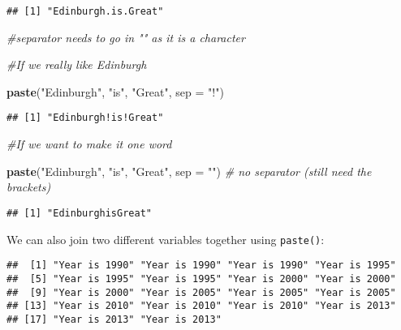 \documentclass[]{book}
\makeatletter
\newenvironment{Shaded}{\begin{snugshade}}{\end{snugshade}}
\newcommand{\KeywordTok}[1]{\textcolor[rgb]{0.13,0.29,0.53}{\textbf{#1}}}
\newcommand{\DataTypeTok}[1]{\textcolor[rgb]{0.13,0.29,0.53}{#1}}
\newcommand{\StringTok}[1]{\textcolor[rgb]{0.31,0.60,0.02}{#1}}
\newcommand{\CommentTok}[1]{\textcolor[rgb]{0.56,0.35,0.01}{\textit{#1}}}
\newcommand{\OperatorTok}[1]{\textcolor[rgb]{0.81,0.36,0.00}{\textbf{#1}}}
\newcommand{\NormalTok}[1]{#1}
\newenvironment{kframe}{%
\medskip{}
\setlength{\fboxsep}{.8em}
 \def\at@end@of@kframe{}%
 \ifinner\ifhmode%
  \def\at@end@of@kframe{\end{minipage}}%
  \begin{minipage}{\columnwidth}%
 \fi\fi%
 \def\FrameCommand##1{\hskip\@totalleftmargin \hskip-\fboxsep
 \colorbox{shadecolor}{##1}\hskip-\fboxsep
     \hskip-\linewidth \hskip-\@totalleftmargin \hskip\columnwidth}%
 \MakeFramed {\advance\hsize-\width
   \@totalleftmargin\z@ \linewidth\hsize
   \@setminipage}}%
 {\par\unskip\endMakeFramed%
 \at@end@of@kframe}
\renewenvironment{Shaded}{\begin{kframe}}{\end{kframe}}
\theoremstyle{definition}
\theoremstyle{definition}
\theoremstyle{definition}
\theoremstyle{remark}
\makeatother
\begin{document}
\begin{verbatim}
## [1] "Edinburgh.is.Great"
\end{verbatim}

\begin{Shaded}
\begin{Highlighting}[]
\CommentTok{#separator needs to go in "" as it is a character}

\CommentTok{#If we really like Edinburgh}

\KeywordTok{paste}\NormalTok{(}\StringTok{"Edinburgh"}\NormalTok{, }\StringTok{"is"}\NormalTok{, }\StringTok{"Great"}\NormalTok{, }\DataTypeTok{sep =} \StringTok{"!"}\NormalTok{)}
\end{Highlighting}
\end{Shaded}

\begin{verbatim}
## [1] "Edinburgh!is!Great"
\end{verbatim}

\begin{Shaded}
\begin{Highlighting}[]
\CommentTok{#If we want to make it one word}

\KeywordTok{paste}\NormalTok{(}\StringTok{"Edinburgh"}\NormalTok{, }\StringTok{"is"}\NormalTok{, }\StringTok{"Great"}\NormalTok{, }\DataTypeTok{sep =} \StringTok{""}\NormalTok{) }\CommentTok{# no separator (still need the brackets)}
\end{Highlighting}
\end{Shaded}

\begin{verbatim}
## [1] "EdinburghisGreat"
\end{verbatim}

We can also join two different variables together using
\texttt{paste()}:

\begin{Shaded}
\end{Shaded}

\begin{verbatim}
##  [1] "Year is 1990" "Year is 1990" "Year is 1990" "Year is 1995"
##  [5] "Year is 1995" "Year is 1995" "Year is 2000" "Year is 2000"
##  [9] "Year is 2000" "Year is 2005" "Year is 2005" "Year is 2005"
## [13] "Year is 2010" "Year is 2010" "Year is 2010" "Year is 2013"
## [17] "Year is 2013" "Year is 2013"
\end{verbatim}
\end{document}

